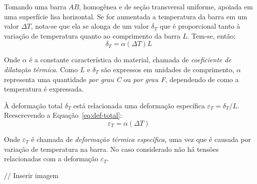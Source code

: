 Tomando uma barra $AB$, homogênea e de seção transversal uniforme, apoiada em uma superfície lisa horizontal. Se for aumentada a temperatura da barra em um valor $\Delta T$, nota-se que ela se alonga de um valor $\delta_T$ que é proporcional tanto à variação de temperatura quanto ao comprimento da barra $L$. Tem-se, então:
\begin{equation}\label{eq:def-total}
	\delta_T=\alpha(\Delta T)L
\end{equation}

Onde $\alpha$ é a constante característica do material, chamada de \textit{coeficiente de dilatação térmica}. Como $L$ e $\delta_T$ são expressos em unidades de comprimento, $\alpha$ representa uma quantidade \textit{por grau C} ou \textit{por grau F}, dependendo de como a temperatura é expressada.

À deformação total $\delta_T$ está relacionada uma deformação específica $\varepsilon_T=\delta_T/L$. Reescrevendo a Equação~\eqref{eq:def-total}:
\begin{equation}
	\varepsilon_T=\alpha(\Delta T)
\end{equation}

Onde $\varepsilon_T$ é chamada de \textit{deformação térmica específica}, uma vez que é causada por variação de temperatura na barra. No caso considerado não há tensões relacionadas com a deformação $\varepsilon_T$.

// Inserir imagem
